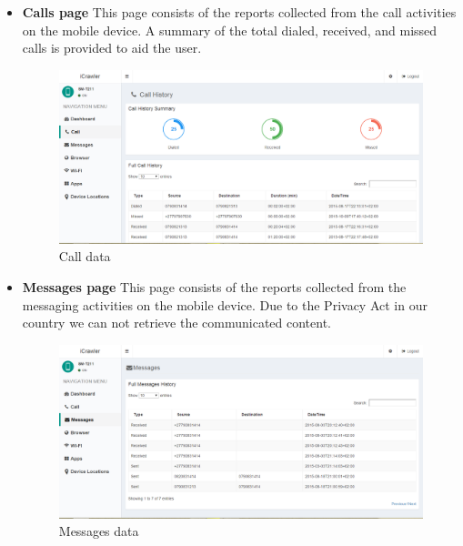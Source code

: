 \documentclass[hidelinks, 12pt, oneside]{article}
\begin{document}
\begin{itemize}
	 	 \item \textbf{Calls page}\newline
	 	This page consists of the reports collected from the call activities on the mobile device. A summary of the total dialed, received, and missed calls is provided to aid the user.
	 	 
	 	 \begin{figure}[h!]
	 	 	\caption{Call data}
	 	 	\centering 																																		\includegraphics[width=1 \textwidth]{img/dashboard/dashboardCall.png}
	 	 \end{figure}\newpage	
	 	 
	 	 \item \textbf{Messages page}\newline
	 	This page consists of the reports collected from the messaging activities on the mobile device. Due to the Privacy Act in our country we can not retrieve the communicated content.
	 	 
	 	 \begin{figure}[h!]
	 	 	\caption{Messages data}
	 	 	\centering 																																		\includegraphics[width=1 \textwidth]{img/dashboard/dashboardMessages.png}
	 	 \end{figure}\newpage	
	 

\end{itemize}
\end{document}
